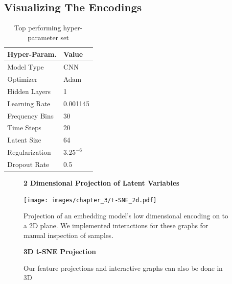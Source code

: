 \documentclass[\main/thesis.tex]{subfiles}
\begin{document}
\subsection{Visualizing The Encodings}
\label{fig:embedding_FE}
\begin{table}[htbp!]
\centering
\begin{tabular}{|p{6cm}|p{6cm}|}
\hline
Hyper-Param. & Value  \\ \hline
Model Type      &  CNN  \\ \hline
Optimizer       & Adam  \\ \hline
Hidden Layers   & 1  \\\hline
Learning Rate   &  0.001145\\ \hline
Frequency Bins & 30 \\ \hline
Time Steps & 20 \\ \hline
Latent Size & 64 \\ \hline
Regularization & $3.25^{-6}$ \\ \hline
Dropout Rate & 0.5 \\ \hline
\end{tabular}
\caption{Top performing hyper-parameter set}
\label{table:best_params}
\end{table}
\begin{figure}[h!]
\centering
\textbf{2 Dimensional Projection of Latent Variables}\par\medskip
 \texttt{[image: images/chapter\_3/t-SNE\_2d.pdf]}
\caption{Projection of an embedding model's low dimensional encoding on to a 2D plane. We implemented interactions for these graphs for manual inspection of samples.}
\label{fig:2d_tsne}
\end{figure}

\begin{figure}[htbp!]
\centering
\textbf{3D t-SNE Projection}\par\medskip
\mbox{}

\mbox{}

\caption{Our feature projections and interactive graphs can also be done in 3D}
\label{fig:3d_tsne}
\end{figure}
\end{document}
